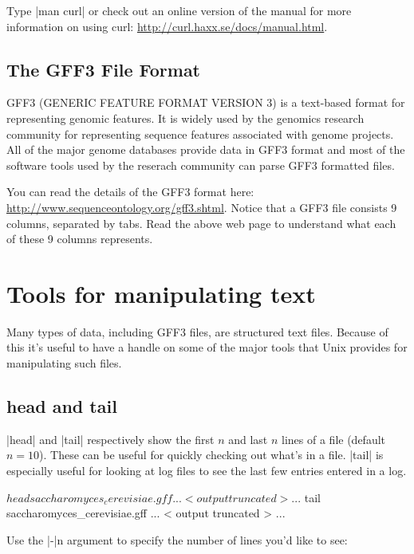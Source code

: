 Type |man curl| or check out an online version of the manual for more information on using curl: \url{http://curl.haxx.se/docs/manual.html}.



\subsection{The GFF3 File Format}

GFF3 (GENERIC FEATURE FORMAT VERSION 3) is a text-based format for representing genomic features. It is widely used by the genomics research community for representing sequence features associated with genome projects. All of the major genome databases provide data in GFF3 format and most of the software tools used by the reserach community can parse GFF3 formatted files.

You can read the details of the GFF3 format here: \url{http://www.sequenceontology.org/gff3.shtml}. Notice that a GFF3 file consists 9 columns, separated by tabs. Read the above web page to understand what each of these 9 columns represents.

\section{Tools for manipulating text}

Many types of data, including GFF3 files,  are structured text files. Because of this it's useful to have a handle on some of the  major tools that Unix provides for manipulating such files.


\subsection{head and tail}

|head| and |tail| respectively show the first $n$ and last $n$ lines of a file (default $n=10$). These can be useful for quickly checking out what's in a file. |tail| is especially useful for looking at log files to see the last few entries entered in a log.

\begin{bash}
$ head saccharomyces_cerevisiae.gff
... < output truncated > ...
$ tail saccharomyces_cerevisiae.gff    
... < output truncated > ...
\end{bash}

Use the |-|n argument to specify the number of lines you'd like to see:


